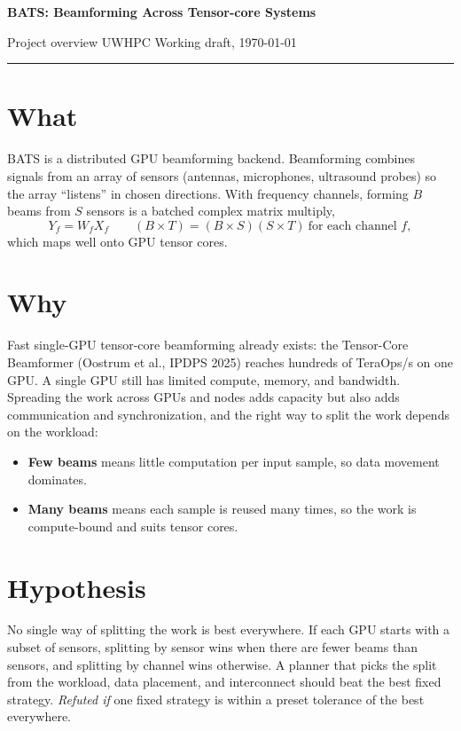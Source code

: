 \documentclass[10pt,letterpaper]{article}
\begin{document}
{\LARGE\bfseries BATS: Beamforming Across Tensor-core Systems\par}
\vspace{2pt}
{\large Project overview \hfill UWHPC \textperiodcentered{} Working draft, \today\par}
\vspace{-4pt}
\noindent\rule{\linewidth}{0.6pt}

\section*{What}
BATS is a distributed GPU beamforming backend. Beamforming combines signals from an array of sensors (antennas, microphones, ultrasound probes) so the array ``listens'' in chosen directions. With frequency channels, forming $B$ beams from $S$ sensors is a batched complex matrix multiply,
\[
  Y_f = W_f X_f \qquad (B \times T) = (B \times S)(S \times T)\ \text{for each channel } f,
\]
which maps well onto GPU tensor cores.

\section*{Why}
Fast single-GPU tensor-core beamforming already exists: the Tensor-Core Beamformer (Oostrum et al., IPDPS 2025) reaches hundreds of TeraOps/s on one GPU. A single GPU still has limited compute, memory, and bandwidth. Spreading the work across GPUs and nodes adds capacity but also adds communication and synchronization, and the right way to split the work depends on the workload:
\begin{itemize}
  \item \textbf{Few beams} means little computation per input sample, so data movement dominates.
  \item \textbf{Many beams} means each sample is reused many times, so the work is compute-bound and suits tensor cores.
\end{itemize}

\section*{Hypothesis}
No single way of splitting the work is best everywhere. If each GPU starts with a subset of sensors, splitting by sensor wins when there are fewer beams than sensors, and splitting by channel wins otherwise. A planner that picks the split from the workload, data placement, and interconnect should beat the best fixed strategy. \emph{Refuted if} one fixed strategy is within a preset tolerance of the best everywhere.
\end{document}
